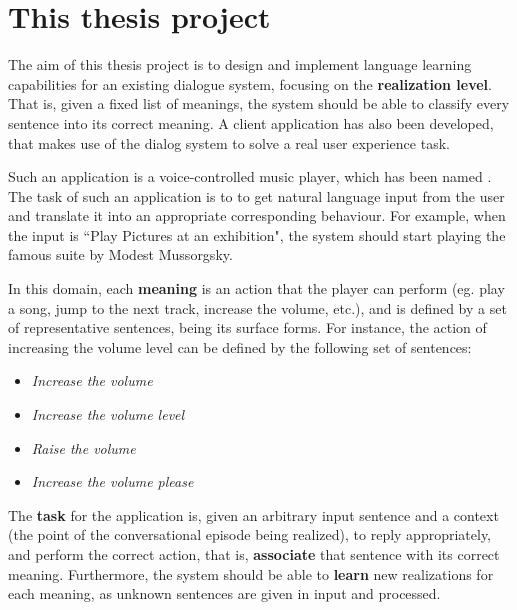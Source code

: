 
\section{This thesis project} \label{ch:intro:project}

The aim of this thesis project is to design and implement language learning capabilities for an existing dialogue system, focusing on the \textbf{realization level}. That is, given a fixed list of meanings, the system should be able to classify every sentence into its correct meaning. A client application has also been developed, that makes use of the dialog system to solve a real user experience task.

Such an application is a voice-controlled music player, which has been named \textbf{\pname}. The task of such an application is to to get natural language input from the user and translate it into an appropriate corresponding behaviour. For example, when the input is ``Play Pictures at an exhibition", the system should start playing the famous suite by Modest Mussorgsky.

In this domain, each \textbf{meaning} is an action that the player can perform (eg. play a song, jump to the next track, increase the volume, etc.), and is defined by a set of representative sentences, being its surface forms. For instance, the action of increasing the volume level can be defined by the following set of sentences:
\begin{itemize}
	\item \textit{Increase the volume}
	\item \textit{Increase the volume level}
	\item \textit{Raise the volume}
	\item \textit{Increase the volume please}
\end{itemize}

The \textbf{task} for the application is, given an arbitrary input sentence and a context (the point of the conversational episode being realized), to reply appropriately, and perform the correct action, that is, \textbf{associate} that sentence with its correct meaning. Furthermore, the system should be able to \textbf{learn} new realizations for each meaning, as unknown sentences are given in input and processed.

